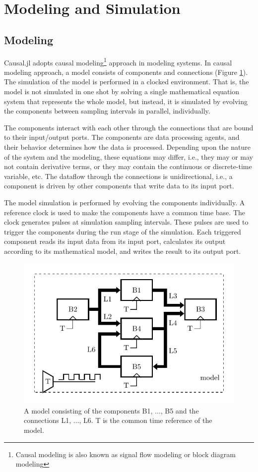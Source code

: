 
\section{Modeling and Simulation}

\subsection{Modeling}

Causal.jl adopts causal modeling\footnote{Causal modeling is also known as signal flow modeling or block diagram modeling} approach in modeling systems. In causal modeling approach, a model consists of components and connections (Figure \ref{fig: simple model})\cite{matei2012modeling}. The simulation of the model is performed in a clocked environment. That is, the model is not simulated in one shot by solving a single mathematical equation system that represents the whole model, but instead, it is simulated by evolving the components between sampling intervals in parallel, individually.

The components interact with each other through the connections that are bound to their input/output ports. The components are data processing agents, and their behavior determines how the data is processed. Depending upon the nature of the system and the modeling, these equations may differ, i.e., they may or may not contain derivative terms, or they may contain the continuous or discrete-time variable, etc. The dataflow through the connections is unidirectional, i.e., a component is driven by other components that write data to its input port.

The model simulation is performed by evolving the components individually. A reference clock is used to make the components have a common time base. The clock generates pulses at simulation sampling intervals. These pulses are used to trigger the components during the run stage of the simulation. Each triggered component reads its input data from its input port, calculates its output according to its mathematical model, and writes the result to its output port.

\begin{figure}
    \centering
    \includegraphics[width=0.75\linewidth]{figures/Model/model.pdf}
    \caption{A model consisting of the components B1, $\ldots$, B5 and the connections L1, $\ldots$, L6. T is the common time reference of the model.}
    \label{fig: simple model}
\end{figure}


